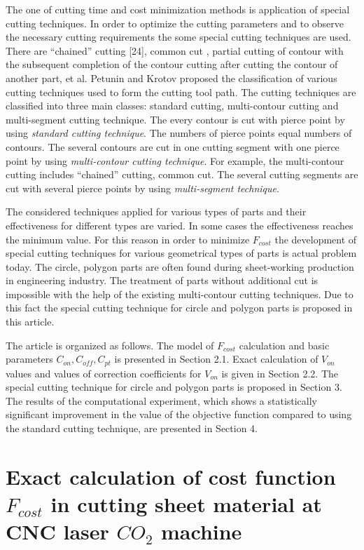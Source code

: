 \documentclass[runningheads]{llncs}
\begin{document}
The one of cutting time and cost minimization methods is
application of special cutting techniques.
In order to optimize the cutting parameters
and to observe the necessary cutting requirements
the some special cutting techniques are used.
There are ``chained'' cutting [24],
common cut \cite{ru25}, partial cutting of contour
with the subsequent completion of the contour cutting
after cutting the contour of another part, et al.
Petunin and Krotov \cite{ru25} proposed the
classification of various cutting techniques
used to form the cutting tool path.
The cutting techniques are classified into three main classes:
standard cutting, multi-contour cutting and multi-segment cutting technique.
The every contour is cut with pierce point by using
\textit{standard cutting technique}.
The numbers of pierce points equal numbers of contours.
The several contours are cut in one cutting segment
with one pierce point by using
\textit{multi-contour cutting technique}.
For example, the multi-contour cutting includes ``chained'' cutting, common cut.
The several cutting segments are cut with several pierce points by using
\textit{multi-segment technique}.

The considered techniques applied for various types of parts
and their effectiveness for different types are varied.
In some cases the effectiveness reaches the minimum value.
For this reason in order to minimize $F_{cost}$
the development of special cutting techniques
for various geometrical types of parts is actual problem today.
The circle, polygon parts are often found during sheet-working production
in engineering industry.
The treatment of parts without additional cut is impossible
with the help of the existing multi-contour cutting techniques.
Due to this fact the special cutting technique
for circle and polygon parts is proposed in this article.

The article is organized as follows.
The model of $F_{cost}$
calculation and basic parameters
$C_{on}, C_{off}, C_{pt}$
is presented in Section 2.1.
Exact calculation of $V_{on}$
values and values of correction coefficients for $V_{on}$
is given in Section 2.2.
The special cutting technique for circle and polygon parts
is proposed in Section 3.
The results of the computational experiment,
which shows a statistically significant improvement
in the value of the objective function
compared to using the standard cutting technique,
are presented in Section 4.

\section{Exact calculation of cost function $F_{cost}$ in cutting sheet material at CNC laser $CO_2$ machine}
\end{document}
